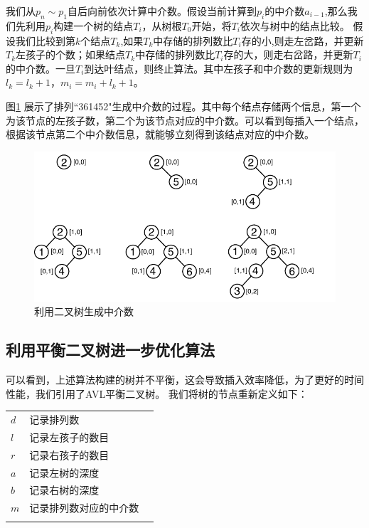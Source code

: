 \documentclass[10pt, twocolumn]{ctexart}
\begin{document}
我们从$p_n\sim p_1$自后向前依次计算中介数。假设当前计算到$p_i$的中介数$a_{i-1}$,那么我们先利用$p_i$构建一个树的结点$T_i$，从树根$T_0$开始，将$T_i$依次与树中的结点比较。
假设我们比较到第$k$个结点$T_k$,如果$T_k$中存储的排列数比$T_i$存的小,则走左岔路，并更新$T_k$左孩子的个数；如果结点$T_k$中存储的排列数比$T_i$存的大，则走右岔路，并更新$T_i$的中介数。一旦$T_i$到达叶结点，则终止算法。其中左孩子和中介数的更新规则为$l_k= l_k + 1$，$m_i = m_i + l_k + 1$。

图\ref{example1} 展示了排列``361452"生成中介数的过程。其中每个结点存储两个信息，第一个为该节点的左孩子数，第二个为该节点对应的中介数。可以看到每插入一个结点，根据该节点第二个中介数信息，就能够立刻得到该结点对应的中介数。
\begin{figure}[!t]
\includegraphics[width=1\columnwidth]{pictures/example1.pdf}
\caption{利用二叉树生成中介数}
\label{example1}
\end{figure}


\subsection{利用平衡二叉树进一步优化算法}
可以看到，上述算法构建的树并不平衡，这会导致插入效率降低，为了更好的时间性能，我们引用了AVL平衡二叉树\cite{Adel1962An}。
我们将树的节点重新定义如下：

\begin{tabular}{m{1cm} l m{8cm}}
\\
$d$ & 记录排列数 \\
$l$ & 记录左孩子的数目\\ 
$r$ & 记录右孩子的数目\\
$a$ & 记录左树的深度\\
$b$ & 记录右树的深度\\
$m$ & 记录排列数对应的中介数\\
\\
\end{tabular}
\end{document}
